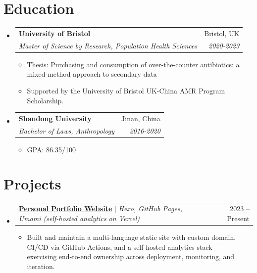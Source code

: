 \documentclass[letterpaper,11pt]{article}
\makeatletter
\newcommand{\resumeItem}[1]{
  \item\small{
    {#1 \vspace{-2pt}}
  }
}
\newcommand{\resumeSubheading}[4]{
  \vspace{-2pt}\item
    \begin{tabular*}{0.97\textwidth}[t]{l@{\extracolsep{\fill}}r}
      \textbf{#1} & #2 \\
      \textit{\small#3} & \textit{\small #4} \\
    \end{tabular*}\vspace{-7pt}
}
\newcommand{\resumeProjectHeading}[2]{
    \item
    \begin{tabular*}{0.97\textwidth}{l@{\extracolsep{\fill}}r}
      \small#1 & #2 \\
    \end{tabular*}\vspace{-7pt}
}
\newcommand{\resumeSubHeadingListStart}{\begin{itemize}[leftmargin=0.15in, label={}]}
\newcommand{\resumeSubHeadingListEnd}{\end{itemize}}
\newcommand{\resumeItemListStart}{\begin{itemize}}
\newcommand{\resumeItemListEnd}{\end{itemize}\vspace{-5pt}}
\makeatother
\begin{document}
\section{Education}
  \resumeSubHeadingListStart
    \resumeSubheading
      {University of Bristol}{Bristol, UK}
      {Master of Science by Research, Population Health Sciences}{2020-2023}
          \resumeItemListStart
            \resumeItem{Thesis: Purchasing and consumption of over-the-counter antibiotics: a mixed-method approach to secondary data}  
            \resumeItem{Supported by the University of Bristol UK-China AMR Program Scholarship.}            

        \resumeItemListEnd

    \resumeSubheading
      {Shandong University}{Jinan, China}
      {Bachelor of Laws, Anthropology}{2016-2020}
          \resumeItemListStart
            \resumeItem{GPA: 86.35/100}        
        \resumeItemListEnd
    
  \resumeSubHeadingListEnd

 
\section{Projects}
    \resumeSubHeadingListStart
      \resumeProjectHeading
          {\textbf{\href{https://www.yunyitang.me/}{\underline{Personal Portfolio Website}}} $|$ \emph{Hexo, GitHub Pages, Umami (self-hosted analytics on Vercel)}}{2023 – Present}
          \resumeItemListStart
            \resumeItem{Built and maintain a multi-language static site with custom domain, CI/CD via GitHub Actions, and a self-hosted analytics stack — exercising end-to-end ownership across deployment, monitoring, and iteration.}
          \resumeItemListEnd
    \resumeSubHeadingListEnd



\end{document}
